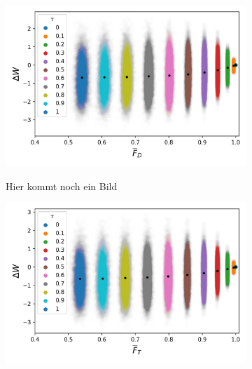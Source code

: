 \begin{figure}[h]
	\centering
	\begin{subfigure}{0.4\textwidth}
		\centering
		\includegraphics[width=\textwidth]{img/noisy_drive_bi_true_3}
	\end{subfigure}
	\begin{subfigure}{0.4\textwidth}
	\centering
	Hier kommt noch ein Bild
	\end{subfigure}
	\begin{subfigure}{0.4\textwidth}
		\centering
		\includegraphics[width=\textwidth]{img/noisy_trans_bi_true_3}
	\end{subfigure}
	\begin{subfigure}{0.4\textwidth}

\end{subfigure}
\end{figure}
